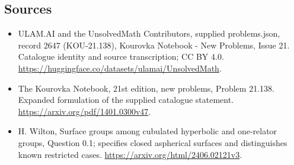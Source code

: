 \documentclass[11pt,a4paper]{article}
\begin{document}
\subsection{Sources}
\begin{itemize}
\item[S1] ULAM.AI and the UnsolvedMath Contributors, supplied problems.json, record 2647 (KOU-21.138), Kourovka Notebook - New Problems, Issue 21. Catalogue identity and source transcription; CC BY 4.0.
\url{https://huggingface.co/datasets/ulamai/UnsolvedMath}.
\item[S2] The Kourovka Notebook, 21st edition, new problems, Problem 21.138. Expanded formulation of the supplied catalogue statement.
\url{https://arxiv.org/pdf/1401.0300v47}.
\item[S3] H. Wilton, Surface groups among cubulated hyperbolic and one-relator groups, Question 0.1; specifies closed aspherical surfaces and distinguishes known restricted cases.
\url{https://arxiv.org/html/2406.02121v3}.
\end{itemize}
\end{document}
